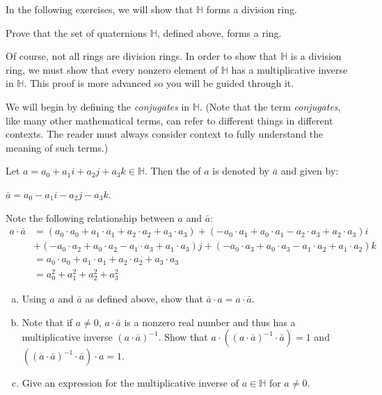 In the following exercises, we will show that ${\mathbb H}$ forms a division ring.

\begin{exercise}{}
Prove that the set of quaternions ${\mathbb H}$, defined above, forms a ring.
\end{exercise}

Of course, not all rings are division rings.  In order to show that ${\mathbb H}$ is a division ring, we must show that every nonzero element of ${\mathbb H}$ has a multiplicative inverse in ${\mathbb H}$.  This proof is more advanced so you will be guided through it.  

We will begin by defining the \emph{conjugates} in ${\mathbb H}$.  (Note that the term \emph{conjugates}, like many other mathematical terms, can refer to different things in different contexts.  The reader must always consider context to fully understand the meaning of such terms.)

\begin{defn}
Let $a=a_0+a_1i+a_2j+a_3k\in{\mathbb H}$.  Then the  of $a$ is denoted by $\bar{a}$ and given by:
\begin{center}
$\bar{a}=a_0-a_1i-a_2j-a_3k$.
\end{center}
\end{defn}

Note the following relationship between $a$ and $\bar{a}$:
\begin{align*}
a\cdot \bar{a}&=(a_0\cdot a_0+a_1\cdot a_1+a_2\cdot a_2+a_3\cdot a_3)+(-a_0\cdot a_1+a_0\cdot a_1-a_2\cdot a_3+a_2\cdot a_3)i\\
&+(-a_0\cdot a_2+a_0\cdot a_2-a_1\cdot a_3+a_1\cdot a_3)j+(-a_0\cdot a_3+a_0\cdot a_3-a_1\cdot a_2+a_1\cdot a_2)k\\
&=a_0\cdot a_0+a_1\cdot a_1+a_2\cdot a_2+a_3\cdot a_3\\
&=a_0^2+a_1^2+a_2^2+a_3^2
\end{align*}

\begin{exercise}{}
\begin{enumerate}[(a)]
\item Using $a$ and $\bar{a}$ as defined above, show that $\bar{a}\cdot a=a\cdot\bar{a}$.
\item Note that if $a\neq 0$, $a\cdot \bar{a}$ is a nonzero real number and thus has a multiplicative inverse $(a\cdot \bar{a})^{-1} $. Show that $a\cdot\left( (a\cdot \bar{a})^{-1}\cdot \bar{a}\right)=1$ and $\left( (a\cdot \bar{a})^{-1}\cdot \bar{a}\right)\cdot a=1$.
\item Give an expression for the multiplicative inverse of $a\in{\mathbb H}$ for $a\neq 0$.
\end{enumerate}
\end{exercise}

